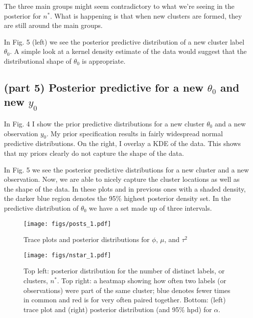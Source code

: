 \documentclass[12pt]{article}
\begin{document}
The three main groups might seem contradictory to what we're seeing in the posterior for $n^*$. What is happening is that when new clusters are formed, they are still around the main groups.

In Fig. 5 (left) we see the posterior predictive distribution of a new cluster label $\theta_0$. A simple look at a kernel density estimate of the data would suggest that the distributional shape of $\theta_0$ is appropriate.

\subsection*{(part 5) Posterior predictive for a new $\theta_0$ and new $y_0$}

In Fig. 4 I show the prior predictive distributions for a new cluster $\theta_0$ and a new observation $y_0$. My prior specification results in fairly widespread normal predictive distributions. On the right, I overlay a KDE of the data. This shows that my priors clearly do not capture the shape of the data.

In Fig. 5 we see the posterior predictive distributions for a new cluster and a new observation. Now, we are able to nicely capture the cluster locations as well as the shape of the data. In these plots and in previous ones with a shaded density, the darker blue region denotes the 95\% highest posterior density set. In the predictive distribution of $\theta_0$ we have a set made up of three intervals.
 
\newpage


\begin{figure}[H]
\begin{center}
\texttt{[image: figs/posts\_1.pdf]}
\caption{Trace plots and posterior distributions for $\phi$, $\mu$, and $\tau^2$}
\end{center}
\end{figure}

\begin{figure}[H]
\begin{center}
\texttt{[image: figs/nstar\_1.pdf]}
\caption{Top left: posterior distribution for the number of distinct labels, or clusters, $n^*$. Top right: a heatmap showing how often two labels (or observations) were part of the same cluster; blue denotes fewer times in common and red is for very often paired together. Bottom: (left) trace plot and (right) posterior distribution (and 95\% hpd) for $\alpha$.}
\end{center}
\end{figure}
\end{document}

